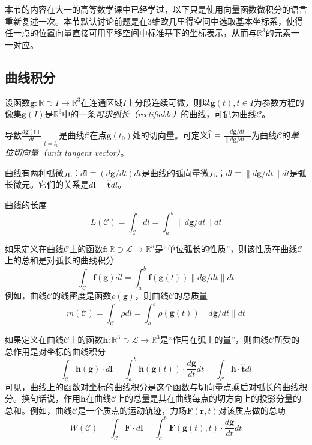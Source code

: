 \documentclass[main.tex]{subfiles}
\begin{document}
本节的内容在大一的高等数学课中已经学过\cite[第九章]{华工高数2009下}，以下只是使用向量函数微积分的语言重新复述一次。本节默认讨论前题是在3维欧几里得空间中选取基本坐标系，使得任一点的位置向量直接可用平移空间中标准基下的坐标表示，从而与$\mathbb{R}^3$的元素一一对应。

\subsection{曲线积分}
设函数$\mathbf{g}:\mathbb{R}\supset I\rightarrow\mathbb{R}^3$在连通区域$I$上分段连续可微，则以$\mathbf{g}\left(t\right),t\in I$为参数方程的像集$\mathbf{g}\left(I\right)$是$\mathbb{R}^3$中的一条\emph{可求弧长（rectifiable）}的曲线，可记为曲线$\mathcal{C}$。

导数$\left.\frac{d\mathbf{g}\left(t\right)}{dt}\right|_{t=t_0}$是曲线$\mathcal{C}$在点$\mathbf{g}\left(t_0\right)$处的切向量。可定义$\mathbf{\hat{t}}\equiv\frac{d\mathbf{g}/dt}{\left\|d\mathbf{g}/dt\right\|}$为曲线$\mathcal{C}$的\emph{单位切向量（unit tangent vector）}。

曲线有两种弧微元：$d\mathbf{l}\equiv\left(d\mathbf{g}/dt\right)dt$是曲线的弧向量微元；$dl\equiv\left\|d\mathbf{g}/dt\right\|dt$是弧长微元。它们的关系是$d\mathbf{l}=\mathbf{\hat{t}}dl$。

曲线的长度
\[L\left(\mathcal{C}\right)=\int_\mathcal{C}dl=\int_a^b\left\|d\mathbf{g}/dt\right\|dt
\]

如果定义在曲线$\mathcal{C}$上的函数$\mathbf{f}:\mathbb{R}\supset\mathcal{L}\rightarrow\mathbb{R}^n$是“单位弧长的性质”，则该性质在曲线$\mathcal{C}$上的总和是对弧长的曲线积分\cite[p.~133,定理9.1.1]{华工高数2009下}
\[
    \int_\mathcal{C}\mathbf{f}\left(\mathbf{g}\right)dl=\int_{a}^{b}\mathbf{f}\left(\mathbf{g}\left(t\right)\right)\left\|d\mathbf{g}/dt\right\|dt
\]
例如，曲线$\mathcal{C}$的线密度是函数$\rho\left(\mathbf{g}\right)$，则曲线$\mathcal{C}$的总质量
\[
    m\left(\mathcal{C}\right)=\int_\mathcal{C}\rho dl=\int_a^b\rho\left(\mathbf{g}\left(t\right)\right)\left\|d\mathbf{g}/dt\right\|dt
\]

如果定义在曲线$\mathcal{C}$上的函数$\mathbf{h}:\mathbb{R}^3\supset\mathcal{L}\rightarrow\mathbb{R}^3$是“作用在弧上的量”，则曲线$\mathcal{C}$所受的总作用是对坐标的曲线积分\cite[p.~140,定理9.2.1]{华工高数2009下}
\[
    \int_\mathcal{C}\mathbf{h}\left(\mathbf{g}\right)\cdot d\mathbf{l}=\int_a^b\mathbf{h}\left(\mathbf{g}\left(t\right)\right)\cdot\frac{d\mathbf{g}}{dt}dt=\int_\mathcal{C}\mathbf{h}\cdot\mathbf{\hat{t}}dl
\]
可见，曲线上的函数对坐标的曲线积分是这个函数与切向量点乘后对弧长的曲线积分。换句话说，作用$\mathbf{h}$在曲线$\mathcal{C}$上的总量是其在曲线每点的切方向上的投影分量的总和。例如，曲线$\mathcal{C}$是一个质点的运动轨迹，力场$\mathbf{F}\left(\mathbf{r},t\right)$对该质点做的总功
\[W\left(\mathcal{C}\right)=\int_\mathcal{C}\mathbf{F}\cdot d\mathbf{l}=\int_a^b\mathbf{F}\left(\mathbf{g}\left(t\right),t\right)\cdot \frac{d\mathbf{g}}{dt}dt
\]
\end{document}

